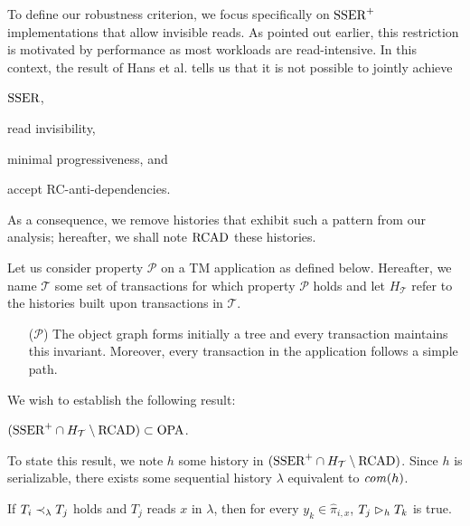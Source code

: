 To define our robustness criterion, we focus specifically on $\SPSER$ implementations that allow invisible reads.
As pointed out earlier, this restriction is motivated by performance as most workloads are read-intensive.
In this context, the result of Hans et al. \cite{hans16} tells us that it is not possible to jointly achieve
\begin{inparaenum}
\item $\SSER$,
\item read invisibility,
\item minimal progressiveness, and
\item accept RC-anti-dependencies.
\end{inparaenum}
As a consequence, we remove histories that exhibit such a pattern from our analysis; hereafter, we shall note $\RCAD$ these histories.

Let us consider property $\mathcal{P}$ on a TM application as defined below.
Hereafter, we name $\mathcal{T}$ some set of transactions for which property $\mathcal{P}$ holds and let $H_{\mathcal{T}}$ refer to the histories built upon transactions in $\mathcal{T}$.
\begin{itemize}
\item[($\mathcal{P}$)]
  The object graph forms initially a tree and every transaction maintains this invariant.
  Moreover, every transaction in the application follows a simple path.
\end{itemize}
We wish to establish the following result:

\begin{proposition}
  $(\SPSER \inter H_{\mathcal{T}} \setminus \RCAD) \subset \OPA$.
\end{proposition}

To state this result, we note $h$ some history  in $(\SPSER \inter H_{\mathcal{T}} \setminus \RCAD)$.
Since $h$ is serializable, there exists some sequential history $\lambda$ equivalent to $\committed{h}$.

\begin{lemma}
  If $T_i \hb_{\lambda} T_j$ holds and $T_j$ reads $x$ in $\lambda$, then for every $y_k \in \hat{\pi}_{i,x}$, $T_j \depends_h T_k$ is true.
\end{lemma}

